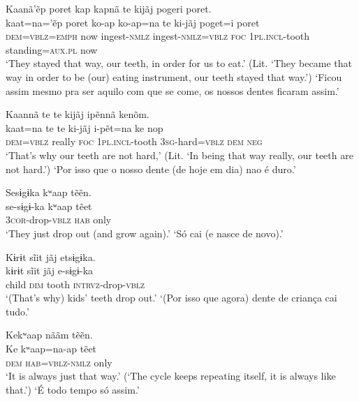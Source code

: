 \documentclass[output=paper,
modfonts,nonflat
]{langsci/langscibook}
\begin{document}
\ea Kaanã'ẽp poret kap kapnã te kijãj pogeri poret.\\[.3em]
\gll kaat=na='ẽp poret ko-ap ko-ap=na te ki-jãj poget=i poret\\
     \textsc{dem}=\textsc{vblz}=\textsc{emph} now  ingest-\textsc{nmlz} ingest-\textsc{nmlz}=\textsc{vblz} \textsc{foc} \textsc{1pl.incl}-tooth standing=\textsc{aux.pl} now\\
\glt ‘They stayed that way, our teeth, in order for us to eat.’  (Lit. ‘They became that way in order to be (our) eating instrument, our teeth stayed that way.')
\glt ‘Ficou assim mesmo pra ser aquilo com que se come, os nossos dentes ficaram assim.'
\z 

\newpage 
\ea Kaannã{\footnotemark} te te kijãj ipẽnnã kenõm.\\[.3em]
\gll kaat=na te te ki-jãj i-pẽt=na ke nop\\
     \textsc{dem}=\textsc{vblz} really \textsc{foc} \textsc{1pl.incl}-tooth \textsc{3sg}-hard=\textsc{vblz} \textsc{dem} \textsc{neg}\\     
\glt ‘That's why our teeth are not hard,’ (Lit. ‘In being that way really, our teeth are not hard.')
\glt ‘Por isso que o nosso dente (de hoje em dia) nao é duro.'
\z 

 
\ea Sesɨgɨka kʷaap tẽẽn.\\[.3em]
\gll se-sɨgɨ-ka kʷaap tẽet\\
     \textsc{3cor}-drop-\textsc{vblz} \textsc{hab} only\\
\glt ‘They just drop out (and grow again).’
\glt ‘Só cai (e nasce de novo).'
\z 

\ea Kɨrɨt sĩit jãj etsɨgɨka.\\[.3em]
\gll kɨrɨt sĩit jãj e-sɨgɨ-ka\\
     child \textsc{dim} tooth \textsc{intrvz}-drop-\textsc{vblz}\\
\glt ‘(That's why) kids' teeth drop out.’
\glt ‘(Por isso que agora) dente de criança cai tudo.'
\z 


\ea Kekʷaap nããm{\footnotemark} tẽẽn.\\[.3em]
\gll Ke kʷaap=na-ap tẽet\\
     \textsc{dem} \textsc{hab}=\textsc{vblz}-\textsc{nmlz} only\\
\glt ‘It is always just that way.’ (‘The cycle keeps repeating itself, it is always like that.’)
\glt ‘É todo tempo só assim.'
\z 
\end{document}

